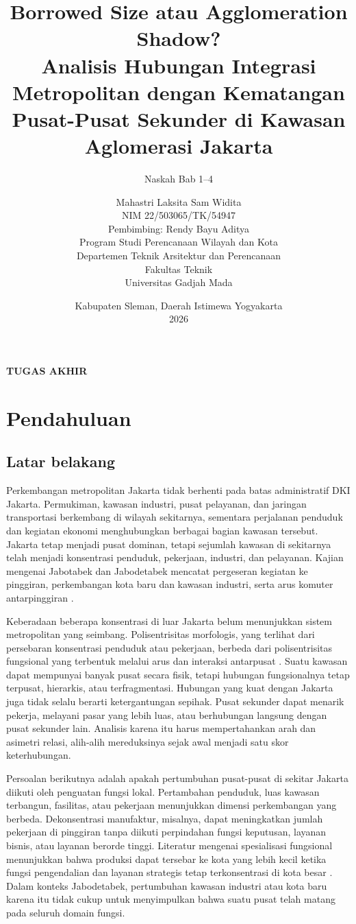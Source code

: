 \documentclass[11pt,a4paper,oneside,openany,indonesian]{report}
\title{\textbf{Borrowed Size atau Agglomeration Shadow?}\\[0.4em]
Analisis Hubungan Integrasi Metropolitan dengan Kematangan Pusat-Pusat Sekunder di Kawasan Aglomerasi Jakarta}
\subtitle{Naskah Bab 1--4}
\author{Mahastri Laksita Sam Widita\\NIM 22/503065/TK/54947\\[0.5em]
Pembimbing: Rendy Bayu Aditya\\[0.5em]
Program Studi Perencanaan Wilayah dan Kota\\
Departemen Teknik Arsitektur dan Perencanaan\\
Fakultas Teknik\\
Universitas Gadjah Mada}
\date{Kabupaten Sleman, Daerah Istimewa Yogyakarta\\2026}
\makeatletter
\renewcommand{\maketitle}{%
  \begin{titlepage}
    \centering
    {\Large\bfseries TUGAS AKHIR\par}
    \vfill
    {\LARGE\bfseries \@title\par}
    \vspace{1.2cm}
    {\large \thesubtitle\par}
    \vfill
    {\large \@author\par}
    \vfill
    {\large \@date\par}
  \end{titlepage}}
\makeatother
\begin{document}
\maketitle
\tableofcontents
\clearpage

\chapter{Pendahuluan}

\section{Latar belakang}

Perkembangan metropolitan Jakarta tidak berhenti pada batas administratif DKI Jakarta. Permukiman, kawasan industri, pusat pelayanan, dan jaringan transportasi berkembang di wilayah sekitarnya, sementara perjalanan penduduk dan kegiatan ekonomi menghubungkan berbagai bagian kawasan tersebut. Jakarta tetap menjadi pusat dominan, tetapi sejumlah kawasan di sekitarnya telah menjadi konsentrasi penduduk, pekerjaan, industri, dan pelayanan. Kajian mengenai Jabotabek dan Jabodetabek mencatat pergeseran kegiatan ke pinggiran, perkembangan kota baru dan kawasan industri, serta arus komuter antarpinggiran \parencite{henderson1996,hudalahfirman2012,hudalahetal2013,sadewoetal2023}.

Keberadaan beberapa konsentrasi di luar Jakarta belum menunjukkan sistem metropolitan yang seimbang. Polisentrisitas morfologis, yang terlihat dari persebaran konsentrasi penduduk atau pekerjaan, berbeda dari polisentrisitas fungsional yang terbentuk melalui arus dan interaksi antarpusat \parencite{burgermeijers2012}. Suatu kawasan dapat mempunyai banyak pusat secara fisik, tetapi hubungan fungsionalnya tetap terpusat, hierarkis, atau terfragmentasi. Hubungan yang kuat dengan Jakarta juga tidak selalu berarti ketergantungan sepihak. Pusat sekunder dapat menarik pekerja, melayani pasar yang lebih luas, atau berhubungan langsung dengan pusat sekunder lain. Analisis karena itu harus mempertahankan arah dan asimetri relasi, alih-alih mereduksinya sejak awal menjadi satu skor keterhubungan.

Persoalan berikutnya adalah apakah pertumbuhan pusat-pusat di sekitar Jakarta diikuti oleh penguatan fungsi lokal. Pertambahan penduduk, luas kawasan terbangun, fasilitas, atau pekerjaan menunjukkan dimensi perkembangan yang berbeda. Dekonsentrasi manufaktur, misalnya, dapat meningkatkan jumlah pekerjaan di pinggiran tanpa diikuti perpindahan fungsi keputusan, layanan bisnis, atau layanan berorde tinggi. Literatur mengenai spesialisasi fungsional menunjukkan bahwa produksi dapat tersebar ke kota yang lebih kecil ketika fungsi pengendalian dan layanan strategis tetap terkonsentrasi di kota besar \parencite{durantonpuga2005}. Dalam konteks Jabodetabek, pertumbuhan kawasan industri atau kota baru karena itu tidak cukup untuk menyimpulkan bahwa suatu pusat telah matang pada seluruh domain fungsi.
\end{document}

